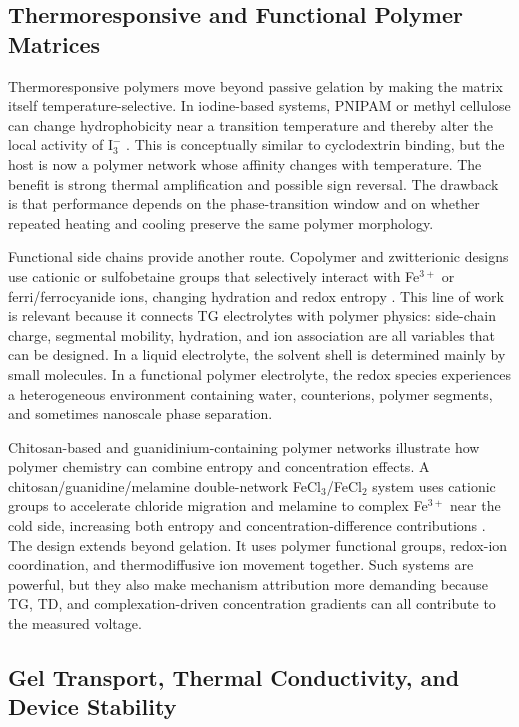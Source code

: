 \subsection{Thermoresponsive and Functional Polymer Matrices}

Thermoresponsive polymers move beyond passive gelation by making the matrix
itself temperature-selective. In iodine-based systems, PNIPAM or methyl
cellulose can change hydrophobicity near a transition temperature and thereby
alter the local activity of $\mathrm{I}_3^-$ \citep{duan2019pn}. This is
conceptually similar to cyclodextrin binding, but the host is now a polymer
network whose affinity changes with temperature. The benefit is strong thermal
amplification and possible sign reversal. The drawback is that performance
depends on the phase-transition window and on whether repeated heating and
cooling preserve the same polymer morphology.

Functional side chains provide another route. Copolymer and zwitterionic
designs use cationic or sulfobetaine groups that
selectively interact with Fe$^{3+}$ or ferri/ferrocyanide ions, changing
hydration and redox entropy \citep{lu2024zwitterion}. This line of work is
relevant because it connects TG electrolytes with polymer physics: side-chain
charge, segmental mobility, hydration, and ion association are all variables
that can be designed. In a liquid electrolyte, the solvent shell is determined
mainly by small molecules. In a functional polymer electrolyte, the redox
species experiences a heterogeneous environment containing water, counterions,
polymer segments, and sometimes nanoscale phase separation.

Chitosan-based and guanidinium-containing polymer networks illustrate how
polymer chemistry can combine entropy and concentration effects. A
chitosan/guanidine/melamine double-network FeCl$_3$/FeCl$_2$ system uses
cationic groups to accelerate chloride migration and melamine to complex
Fe$^{3+}$ near the cold side, increasing both entropy and
concentration-difference contributions \citep{hu2024doubleselective}. The design
extends beyond gelation. It uses polymer functional groups,
redox-ion coordination, and thermodiffusive ion movement together. Such systems
are powerful, but they also make mechanism attribution more demanding because
TG, TD, and complexation-driven concentration gradients can all contribute to
the measured voltage.

\subsection{Gel Transport, Thermal Conductivity, and Device Stability}

